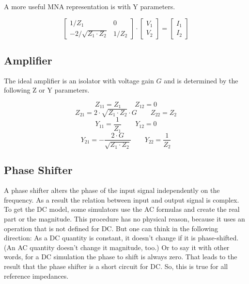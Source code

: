 A more useful MNA representation is with Y parameters.

\begin{equation}
\begin{bmatrix}
 1/Z_1 & 0 \\
 -2/\sqrt{Z_1\cdot Z_2} & 1/Z_2
\end{bmatrix}
\cdot
\begin{bmatrix}
V_{1}\\
V_{2}
\end{bmatrix}
=
\begin{bmatrix}
I_{1}\\
I_{2}
\end{bmatrix}
\end{equation}



\subsection{Amplifier}

The ideal amplifier is an isolator with voltage gain $G$ and is
determined by the following Z or Y parameters.

\begin{equation}
Z_{11} = Z_1  \qquad
Z_{12} = 0
\end{equation}
\begin{equation}
Z_{21} = 2\cdot\sqrt{Z_1\cdot Z_2}\cdot G  \qquad
Z_{22} = Z_2
\end{equation}
\begin{equation}
Y_{11} = \frac{1}{Z_1}  \qquad
Y_{12} = 0
\end{equation}
\begin{equation}
Y_{21} = -\frac{2\cdot G}{\sqrt{Z_1\cdot Z_2}}  \qquad
Y_{22} = \frac{1}{Z_2}
\end{equation}

\subsection{Phase Shifter}

A phase shifter alters the phase of the input signal independently on
the frequency.  As a result the relation between input and output
signal is complex.  To get the DC model, some simulators use the AC
formulas and create the real part or the magnitude.  This procedure
has no physical reason, because it uses an operation that is not
defined for DC.  But one can think in the following direction: As a DC
quantity is constant, it doesn't change if it is phase-shifted.  (An
AC quantity doesn't change it magnitude, too.)  Or to say it with
other words, for a DC simulation the phase to shift is always zero.
That leads to the result that the phase shifter is a short circuit for
DC.  So, this is true for all reference impedances.

